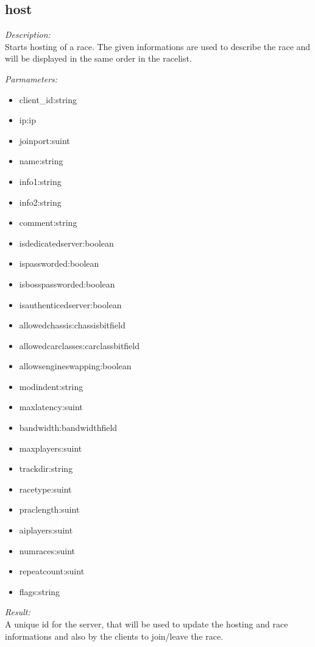 \subsection{host}

\begin{description}
\item {\it Description:}\\
Starts hosting of a race. The given informations are used to describe the race and will be displayed in the same order in the racelist.
\item {\it Parmameters:}
\begin{itemize}
\item client\_id:string
\item ip:ip
\item joinport:suint
\item name:string
\item info1:string
\item info2:string
\item comment:string
\item isdedicatedserver:boolean
\item ispassworded:boolean
\item isbosspassworded:boolean
\item isauthenticedserver:boolean
\item allowedchassis:chassisbitfield
\item allowedcarclasses:carclassbitfield
\item allowsengineswapping:boolean
\item modindent:string
\item maxlatency:suint
\item bandwidth:bandwidthfield
\item maxplayers:suint
\item trackdir:string
\item racetype:suint
\item praclength:suint
\item aiplayers:suint
\item numraces:suint
\item repeatcount:suint
\item flags:string
\end{itemize}
\item {\it Result:}\\
A unique id for the server, that will be used to update the hosting and race informations and also by the clients to join/leave the race.
\end{description}

